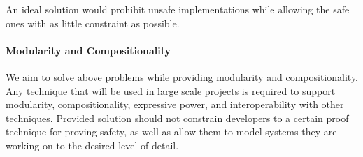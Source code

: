An ideal solution would prohibit unsafe implementations while allowing the safe ones with as little constraint as possible.  


\paragraph{Modularity and Compositionality}
We aim to solve above problems while providing modularity and compositionality. Any technique that will be used in large scale projects is required to support modularity, compositionality, expressive power, and interoperability with other techniques. Provided solution should not constrain developers to a certain proof technique for proving safety, as well as allow them to model systems they are working on to the desired level of detail. 



